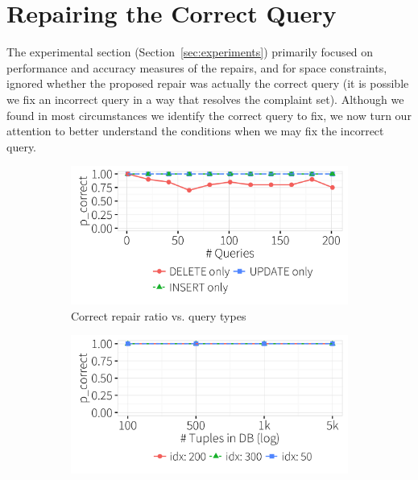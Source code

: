 
\section{Repairing the Correct Query}
\label{app:index}

The experimental section (Section~\ref{sec:experiments}) primarily focused on performance and accuracy measures of the repairs, and for space constraints, ignored 
whether the proposed repair was actually the correct query (it is possible we fix an incorrect query in a way that resolves the complaint set).
Although we found in most circumstances we identify the correct query to fix, we now turn our attention to better understand 
the conditions when we may fix the incorrect query. 

   \begin{figure}[t]
  \centering
  \begin{subfigure} [t]{.3\textwidth}
    \includegraphics[width = .99\columnwidth]{figures/indelup_acc_idx}
    \vspace*{-.25in}
    \caption{Correct repair ratio vs. query types}
    \label{f:querytyperatio} 
    \end{subfigure}
    \begin{subfigure} [t]{.3\textwidth}
    \includegraphics[width = .99\columnwidth]{figures/dbsize_acc_idx}

\end{subfigure}
\end{figure}
